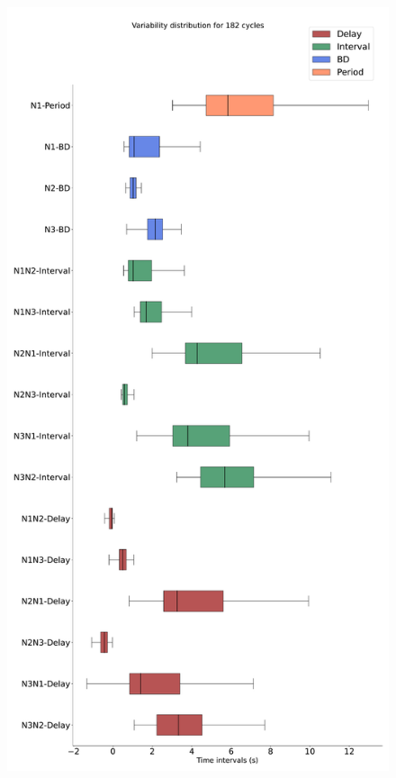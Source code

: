 \begin{figure}[htbp]
\begin{minipage}[b]{0.45\textwidth}
		\includegraphics[width=\textwidth]{./invariants/data/SUSSEX/prep1/images/spontaneous_boxplot.pdf}
	\end{minipage}
	\begin{minipage}[b]{0.53\textwidth}
		\centering

\end{minipage}
\end{figure}
